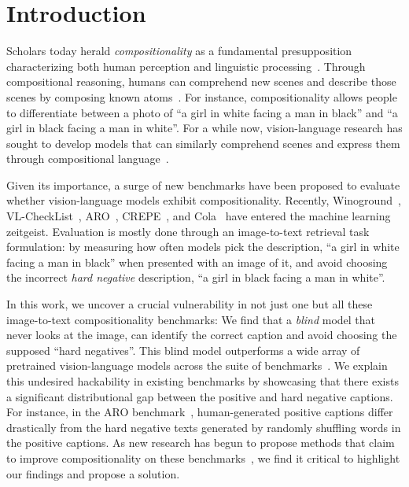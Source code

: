 \section{Introduction}
\label{sec:intro}

Scholars today herald \emph{compositionality} as a fundamental presupposition characterizing both human perception and linguistic processing~\cite{cresswell1973logics}.
Through compositional reasoning, humans can comprehend new scenes and describe those scenes by composing known atoms~\cite{janssen1997compositionality,hupkes2020compositionality,bottou2014machine,chomsky1965some}.
For instance, compositionality allows people to differentiate between a photo of ``a girl in white facing a man in black'' and ``a girl in black facing a man in white''.
For a while now, vision-language research has sought to develop models that can similarly comprehend scenes and express them through compositional language~\cite{krishna2017visual,ji2020action,lu2016visual,GrundeMcLaughlin2021AGQA}.


Given its importance, a surge of new benchmarks have been proposed to evaluate whether vision-language models exhibit compositionality.
Recently,  Winoground~\cite{thrush2022winoground}, VL-CheckList~\cite{zhao2022vl}, ARO~\cite{yuksekgonul2023when}, CREPE~\cite{ma2022crepe}, and Cola~\cite{ray2023cola} have entered the machine learning zeitgeist.
Evaluation is mostly done through an image-to-text retrieval task formulation: by measuring how often models pick the description, ``a girl in white facing a man in black'' when presented with an image of it, and avoid choosing the incorrect \emph{hard negative} description, ``a girl in black facing a man in white''.


In this work, we uncover a crucial vulnerability in not just one but all these image-to-text compositionality benchmarks:
We find that a \emph{blind} model that never looks at the image, can identify the correct caption and avoid choosing the supposed ``hard negatives''.
This blind model outperforms a wide array of pretrained vision-language models across the suite of benchmarks~\cite{RadfordKHRGASAM21,ilharco_gabriel_2021_5143773,gadre2023datacomp}.
We explain this undesired hackability in existing benchmarks by showcasing that there exists a significant distributional gap between the positive and hard negative captions.
For instance, in the ARO benchmark~\cite{yuksekgonul2023when}, human-generated positive captions differ drastically from the hard negative texts generated by randomly shuffling words in the positive captions.
As new research has begun to propose methods that claim to improve compositionality on these benchmarks~\cite{yuksekgonul2023when,ray2023cola}, we find it critical to highlight our findings and propose a solution.


